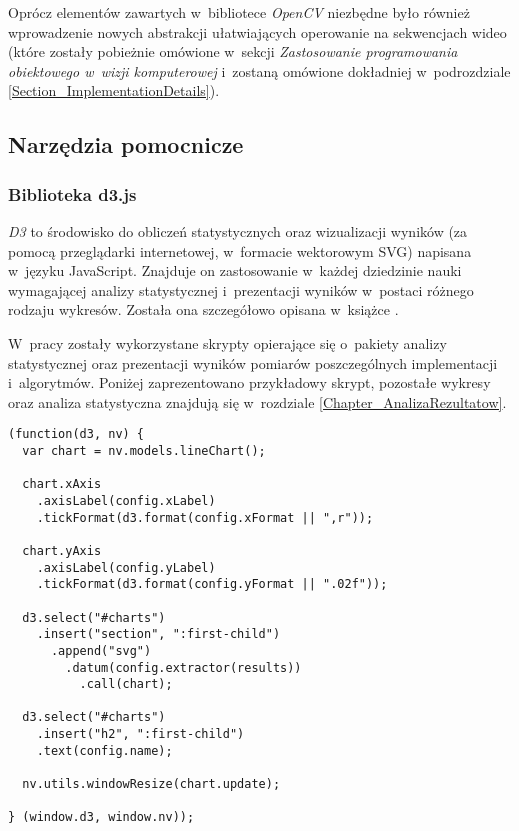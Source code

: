         Oprócz elementów zawartych w~bibliotece \textit{OpenCV} niezbędne było również wprowadzenie nowych abstrakcji ułatwiających operowanie na sekwencjach wideo (które zostały pobieżnie omówione w~sekcji \textit{Zastosowanie programowania obiektowego w~wizji komputerowej} i~zostaną omówione dokładniej w~podrozdziale \ref{Section_ImplementationDetails}).

    \subsection{Narzędzia pomocnicze}\label{Subsection_PomocniczeTechnologie}

      \subsubsection{Biblioteka d3.js}

        \textit{D3} to środowisko do obliczeń statystycznych oraz wizualizacji wyników (za pomocą przeglądarki internetowej, w~formacie wektorowym SVG) napisana w~języku JavaScript. Znajduje on zastosowanie w~każdej dziedzinie nauki wymagającej analizy statystycznej i~prezentacji wyników w~postaci różnego rodzaju wykresów. Została ona szczegółowo opisana w~książce \cite{D3Book}.

        W~pracy zostały wykorzystane skrypty opierające się o~pakiety analizy statystycznej oraz prezentacji wyników pomiarów poszczególnych implementacji i~algorytmów. Poniżej zaprezentowano przykładowy skrypt, pozostałe wykresy oraz analiza statystyczna znajdują się w~rozdziale \ref{Chapter_AnalizaRezultatow}.

          \begin{sample}[ht]
            \begin{verbatim}
(function(d3, nv) {
  var chart = nv.models.lineChart();

  chart.xAxis
    .axisLabel(config.xLabel)
    .tickFormat(d3.format(config.xFormat || ",r"));

  chart.yAxis
    .axisLabel(config.yLabel)
    .tickFormat(d3.format(config.yFormat || ".02f"));

  d3.select("#charts")
    .insert("section", ":first-child")
      .append("svg")
        .datum(config.extractor(results))
          .call(chart);

  d3.select("#charts")
    .insert("h2", ":first-child")
    .text(config.name);

  nv.utils.windowResize(chart.update);

} (window.d3, window.nv));
            \end{verbatim}
            \caption{Skrypt przygotowujący wykres liniowy za pomocą biblioteki d3.js}
            \label{ChartForRunningTimePerAlgorithm}
          \end{sample}

